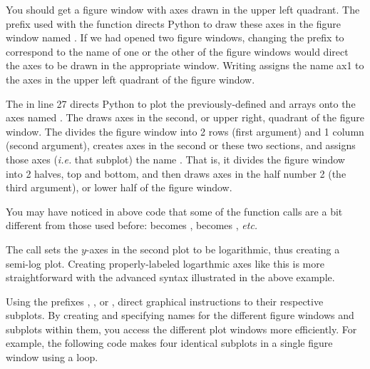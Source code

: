 \documentclass[letterpaper,10pt,english]{sphinxmanual}
\begin{document}
You should get a figure window with axes drawn in the upper left quadrant.  The  prefix used with the  function directs Python to draw these axes in the figure window named .  If we had opened two figure windows, changing the prefix to correspond to the name of one or the other of the figure windows would direct the axes to be drawn in the appropriate window.  Writing  assigns the name ax1 to the axes in the upper left quadrant of the figure window.

The  in line 27 directs Python to plot the previously-defined  and  arrays onto the axes named . The  draws axes in the second, or upper right, quadrant of the figure window. The  divides the figure window into 2 rows (first argument) and 1 column (second argument), creates axes in the second or these two sections, and assigns those axes (\emph{i.e.} that subplot) the name .  That is, it divides the figure window into 2 halves, top and bottom, and then draws axes in the half number 2 (the third argument), or lower half of the figure window.

You may have noticed in above code that some of the function calls are a bit different from those used before:  becomes ,  becomes , \emph{etc.}

The call  sets the \(y\)-axes in the second plot to be logarithmic, thus creating a semi-log plot.  Creating properly-labeled logarthmic axes like this is more straightforward with the advanced syntax illustrated in the above example.

Using the prefixes , , or , direct graphical instructions to their respective subplots.  By creating and specifying names for the different figure windows and subplots within them, you access the different plot windows more efficiently.  For example, the following code makes four identical subplots in a single figure window using a  loop.
\end{document}
